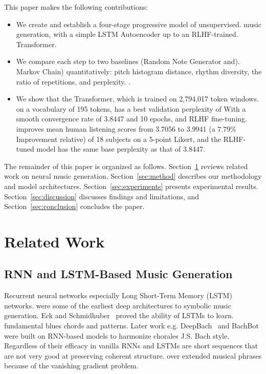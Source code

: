 \documentclass[conference]{IEEEtran}
\begin{document}
This paper makes the following contributions:
\begin{itemize}
    \item We create and establish a four-stage progressive model of unsupervised.
    music generation, with a simple LSTM Autoencoder up to an RLHF-trained.
    Transformer.
    \item  We compare each step to two baselines (Random Note Generator and).
    Markov Chain) quantitatively: pitch histogram distance, rhythm
    diversity, the ratio of repetitions, and perplexity.
.
    \item 
    We show that the Transformer, which is trained on 2,794,017 token windows.
    on a vocabulary of 195 tokens, has a best validation perplexity of
    With a smooth convergence rate of 3.8447 and 10 epochs, and RLHF fine-tuning.
    improves mean human listening scores from 3.7056 to 3.9941 (a $7.79\%$
    Improvement relative) of 18 subjects on a 5-point Likert,
    and the RLHF-tuned model has the same base perplexity as that of 3.8447.
\end{itemize}

The remainder of this paper is organized as follows. Section~\ref{sec:related}
reviews related work on neural music generation. Section~\ref{sec:method} describes
our methodology and model architectures. Section~\ref{sec:experiments} presents
experimental results. Section~\ref{sec:discussion} discusses findings and
limitations, and Section~\ref{sec:conclusion} concludes the paper.


\section{Related Work}
\label{sec:related}

\subsection{RNN and LSTM-Based Music Generation}

Recurrent neural networks especially Long Short-Term Memory (LSTM) networks.
were some of the earliest deep architectures to symbolic music generation.
Eck and Schmidhuber~\cite{eck2002finding} proved the ability of LSTMs to learn.
fundamental blues chords and patterns. Later work e.g.
DeepBach~\cite{hadjeres2017deepbach} and BachBot were built on RNN-based models to
harmonize chorales J.S. Bach style. Regardless of their efficacy in
vanilla RNNs and LSTMs are short sequences that are not very good at preserving coherent structure.
over extended musical phrases because of the vanishing gradient problem.
\end{document}
